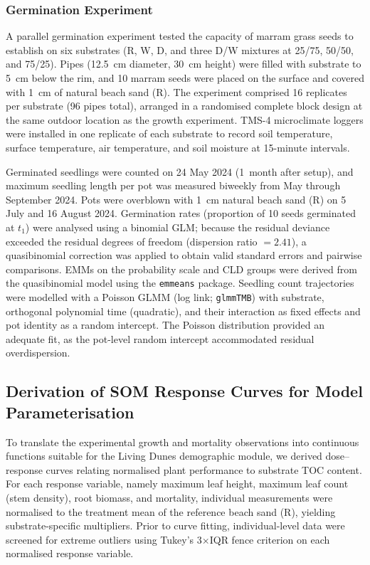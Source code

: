 \documentclass[authoryear,preprint,review,12pt]{elsarticle}
\begin{document}
\subsubsection{Germination Experiment}

A parallel germination experiment tested the capacity of marram grass seeds to establish on six substrates (R, W, D, and three D/W mixtures at 25/75, 50/50, and 75/25). Pipes (\SI{12.5}{\centi\metre} diameter, \SI{30}{\centi\metre} height) were filled with substrate to \SI{5}{\centi\metre} below the rim, and 10 marram seeds were placed on the surface and covered with \SI{1}{\centi\metre} of natural beach sand (R). The experiment comprised 16 replicates per substrate (96 pipes total), arranged in a randomised complete block design at the same outdoor location as the growth experiment. TMS-4 microclimate loggers were installed in one replicate of each substrate to record soil temperature, surface temperature, air temperature, and soil moisture at 15-minute intervals.

Germinated seedlings were counted on 24 May 2024 (1~month after setup), and maximum seedling length per pot was measured biweekly from May through September 2024. Pots were overblown with \SI{1}{\centi\metre} natural beach sand (R) on 5 July and 16 August 2024. Germination rates (proportion of 10 seeds germinated at $t_1$) were analysed using a binomial GLM; because the residual deviance exceeded the residual degrees of freedom (dispersion ratio $= 2.41$), a quasibinomial correction was applied to obtain valid standard errors and pairwise comparisons. EMMs on the probability scale and CLD groups were derived from the quasibinomial model using the \texttt{emmeans} package. Seedling count trajectories were modelled with a Poisson GLMM (log link; \texttt{glmmTMB}) with substrate, orthogonal polynomial time (quadratic), and their interaction as fixed effects and pot identity as a random intercept. The Poisson distribution provided an adequate fit, as the pot-level random intercept accommodated residual overdispersion.


\subsection{Derivation of SOM Response Curves for Model Parameterisation}
\label{sec:som_response_derivation}

To translate the experimental growth and mortality observations into continuous functions suitable for the Living Dunes demographic module, we derived dose--response curves relating normalised plant performance to substrate TOC content. For each response variable, namely maximum leaf height, maximum leaf count (stem density), root biomass, and mortality, individual measurements were normalised to the treatment mean of the reference beach sand (R), yielding substrate-specific multipliers. Prior to curve fitting, individual-level data were screened for extreme outliers using Tukey's 3$\times$IQR fence criterion on each normalised response variable.
\end{document}
